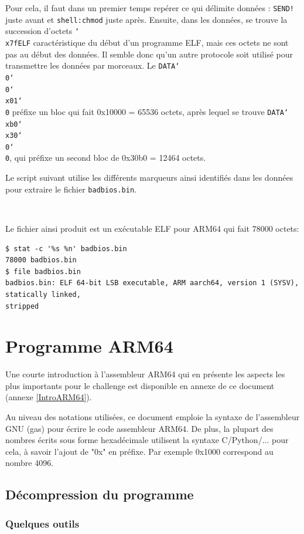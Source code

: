 \documentclass[a4paper,10pt]{article}
\newcommand{\bksl}{\char`\\} %
\newcommand{\pyinput}[1]{%
    \noindent{\color[rgb]{0.5, 0.5, 0.5}{\rule{\textwidth}{0.4pt}}}
     \\
    \noindent{\color[rgb]{0.5, 0.5, 0.5}{\rule{\textwidth}{0.4pt}}}
}
\begin{document}
Pour cela, il faut dans un premier temps repérer ce qui délimite données : \texttt{SEND!} juste avant et \texttt{shell:chmod} juste après. Ensuite, dans les données, se trouve la succession d'octets \texttt{\bksl{x7f}ELF} caractéristique du début d'un programme ELF, mais ces octets ne sont pas au début des données. Il semble donc qu'un autre protocole soit utilisé pour transmettre les données par morceaux. Le \texttt{DATA\bksl{0}\bksl{0}\bksl{x01}\bksl{0}} préfixe un bloc qui fait 0x10000 = 65536 octets, après lequel se trouve \texttt{DATA\bksl{xb0}\bksl{x30}\bksl{0}\bksl{0}}, qui préfixe un second bloc de 0x30b0 = 12464 octets.

Le script suivant utilise les différents marqueurs ainsi identifiés dans les données pour extraire le fichier \texttt{badbios.bin}.

\pyinput{1_usb/extract_badbios.py.inc.tex}

Le fichier ainsi produit est un exécutable ELF pour ARM64 qui fait 78000 octets:
\begin{verbatim}
$ stat -c '%s %n' badbios.bin
78000 badbios.bin
$ file badbios.bin
badbios.bin: ELF 64-bit LSB executable, ARM aarch64, version 1 (SYSV), statically linked,
stripped
\end{verbatim}

\clearpage
\section{Programme ARM64}

Une courte introduction à l'assembleur ARM64 qui en présente les aspects les plus importants pour le challenge est disponible en annexe de ce document (annexe \ref{IntroARM64}).

Au niveau des notations utilisées, ce document emploie la syntaxe de l'assembleur GNU (gas) pour écrire le code assembleur ARM64. De plus, la plupart des nombres écrits sous forme hexadécimale utilisent la syntaxe C/Python/... pour cela, à savoir l'ajout de "0x" en préfixe. Par exemple 0x1000 correspond au nombre 4096.

\subsection{Décompression du programme}

\subsubsection{Quelques outils}
\end{document}
